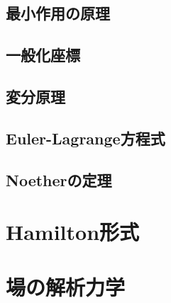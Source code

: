 \documentclass[../main]{subfiles}
\begin{document}
    \subsection{最小作用の原理}

    \subsection{一般化座標}

    \subsection{変分原理}

    \subsection{Euler-Lagrange方程式}

    \subsection{Noetherの定理}

    \section{Hamilton形式}



    \section{場の解析力学}
\end{document}

